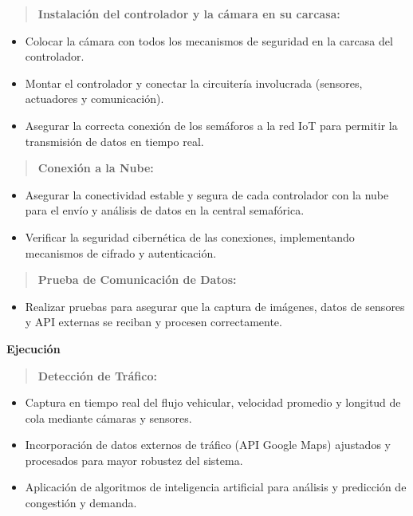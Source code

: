 \documentclass[12pt,a4paper,oneside]{report}
\begin{document}
\begin{quote}
\textbf{Instalación del controlador y la cámara en su carcasa:}
\end{quote}

\begin{itemize}
\item
  Colocar la cámara con todos los mecanismos de seguridad en la carcasa del controlador.
\item
  Montar el controlador y conectar la circuitería involucrada (sensores, actuadores y comunicación).
\item
  Asegurar la correcta conexión de los semáforos a la red IoT para permitir la transmisión de datos en tiempo real.
\end{itemize}

\begin{quote}
\textbf{Conexión a la Nube:}
\end{quote}

\begin{itemize}
\item
  Asegurar la conectividad estable y segura de cada controlador con la nube para el envío y análisis de datos en la central semafórica.
\item
  Verificar la seguridad cibernética de las conexiones, implementando mecanismos de cifrado y autenticación.
\end{itemize}

\begin{quote}
\textbf{Prueba de Comunicación de Datos:}
\end{quote}

\begin{itemize}
\item
  Realizar pruebas para asegurar que la captura de imágenes, datos de sensores y API externas se reciban y procesen correctamente.
\end{itemize}

\textbf{Ejecución}

\begin{quote}
\textbf{Detección de Tráfico:}
\end{quote}

\begin{itemize}
\item
  Captura en tiempo real del flujo vehicular, velocidad promedio y longitud de cola mediante cámaras y sensores.
\item
  Incorporación de datos externos de tráfico (API Google Maps) ajustados y procesados para mayor robustez del sistema.
\item
  Aplicación de algoritmos de inteligencia artificial para análisis y predicción de congestión y demanda.
\end{itemize}
\end{document}
